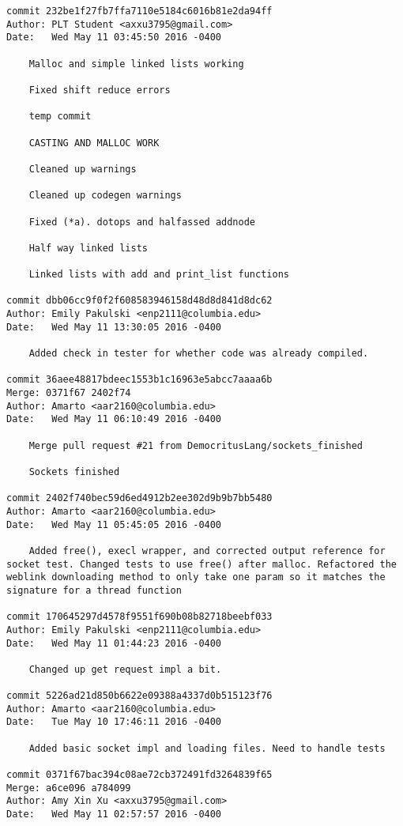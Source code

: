     \begin{lstlisting}[backgroundcolor=\color{white}]
commit 232be1f27fb7ffa7110e5184c6016b81e2da94ff
Author: PLT Student <axxu3795@gmail.com>
Date:   Wed May 11 03:45:50 2016 -0400

    Malloc and simple linked lists working
    
    Fixed shift reduce errors
    
    temp commit
    
    CASTING AND MALLOC WORK
    
    Cleaned up warnings
    
    Cleaned up codegen warnings
    
    Fixed (*a). dotops and halfassed addnode
    
    Half way linked lists
    
    Linked lists with add and print_list functions

commit dbb06cc9f0f2f608583946158d48d8d841d8dc62
Author: Emily Pakulski <enp2111@columbia.edu>
Date:   Wed May 11 13:30:05 2016 -0400

    Added check in tester for whether code was already compiled.

commit 36aee48817bdeec1553b1c16963e5abcc7aaaa6b
Merge: 0371f67 2402f74
Author: Amarto <aar2160@columbia.edu>
Date:   Wed May 11 06:10:49 2016 -0400

    Merge pull request #21 from DemocritusLang/sockets_finished
    
    Sockets finished

commit 2402f740bec59d6ed4912b2ee302d9b9b7bb5480
Author: Amarto <aar2160@columbia.edu>
Date:   Wed May 11 05:45:05 2016 -0400

    Added free(), execl wrapper, and corrected output reference for socket test. Changed tests to use free() after malloc. Refactored the weblink downloading method to only take one param so it matches the signature for a thread function

commit 170645297d4578f9551f690b08b82718beebf033
Author: Emily Pakulski <enp2111@columbia.edu>
Date:   Wed May 11 01:44:23 2016 -0400

    Changed up get request impl a bit.

commit 5226ad21d850b6622e09388a4337d0b515123f76
Author: Amarto <aar2160@columbia.edu>
Date:   Tue May 10 17:46:11 2016 -0400

    Added basic socket impl and loading files. Need to handle tests

commit 0371f67bac394c08ae72cb372491fd3264839f65
Merge: a6ce096 a784099
Author: Amy Xin Xu <axxu3795@gmail.com>
Date:   Wed May 11 02:57:57 2016 -0400


\end{lstlisting}
